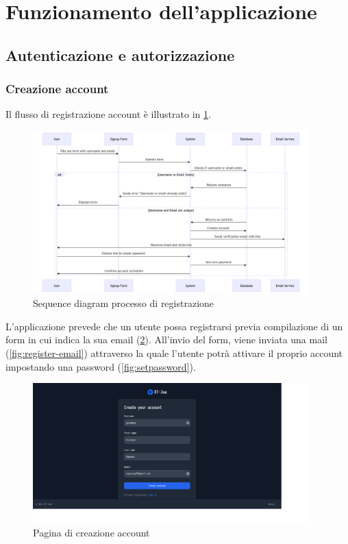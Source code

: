 \documentclass{article}
\begin{document}
\clearpage

\section{Funzionamento dell'applicazione}
\subsection{Autenticazione e autorizzazione}
\subsubsection{Creazione account}
Il flusso di registrazione account è illustrato in \cref{fig:registration-process}.

\begin{figure}
  \begin{center}
    \includegraphics[width=0.95\textwidth]{figures/sq_registration.png}
  \end{center}
  \caption{Sequence diagram processo di registrazione}\label{fig:registration-process}
\end{figure}

L'applicazione prevede che un utente possa registrarsi previa compilazione di un form in 
cui indica la sua email (\cref{fig:sign-up-page}). 
All'invio del form, viene inviata una mail (\cref{fig:register-email})
attraverso la quale l'utente potrà attivare il proprio account impostando una password
(\cref{fig:setpassword}). 

\begin{figure}
  \begin{center}
    \includegraphics[width=0.95\textwidth]{figures/register_page.png}
  \end{center}
  \caption{Pagina di creazione account}\label{fig:sign-up-page}
\end{figure}
\end{document}
